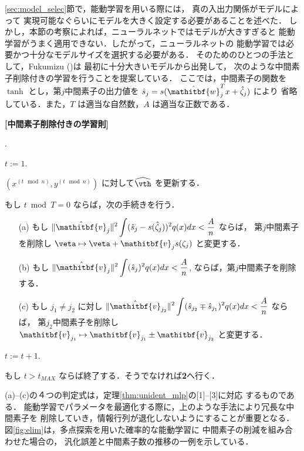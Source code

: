 \documentclass[master]{cimt}
\newcommand{\hvth}{\widehat{{\vth}}}
\newcommand{\vv}{\mathitbf{v}}
\newcommand{\vw}{\mathitbf{w}}
\begin{document}
\ref{sec:model_selec}節で，能動学習を用いる際には，
真の入出力関係がモデルによって
実現可能なぐらいにモデルを大きく設定する必要があることを述べた．
しかし，本節の考察によれば，ニューラルネットではモデルが大きすぎると
能動学習がうまく適用できない．したがって，ニューラルネットの
能動学習では必要かつ十分なモデルサイズを選択する必要がある．
そのためのひとつの手法として，Fukumizu (\cite{fuku_al_ieee})は
最初に十分大きいモデルから出発して，
次のような中間素子削除付きの学習を行うことを提案している．
ここでは，中間素子の関数を $\tanh$ 
とし，第$j$中間素子の出力値を $\hat{s}_j = 
s(\hat{\vw}_j^T x + \hat{\zeta}_j)$ により
省略している．また，$T$ は適当な自然数，$A$ は適当な正数である．

\bigskip 
\noindent
{\bf [中間素子削除付きの学習則]}
\begin{list} 
{{\bf {}}.}{\setlength{\itemsep}{2pt}\setlength{\leftmargin}{20pt}}
\item $t := 1$.  
\item  $(x^{(t\, \bmod n)}, y^{(t\, \bmod n)})$ に対して$\hvth$ 
を更新する．  
\item もし $t \bmod T = 0$ ならば，次の手続きを行う．
\begin{enumerate}
\item[(a)] もし  
${\displaystyle 
\|\hat{\vv}_{j} \|^{2} \int (\hat{s}_{j}-s(\hat{\zeta}_{j}))^{2}
q(x)dx < \frac{A}{n}}$ ならば，
第$j$中間素子を削除し 
$\veta \mapsto \veta + \vv_j s(\zeta_j)$ と変更する．
\item[(b)] もし 
${\displaystyle
\|\hat{\vv}_{j}\|^{2} \int (\hat{s}_{j})^{2}q(x)dx < \frac{A}{n}}$, 
ならば，第$j$中間素子を削除する．
\item[(c)] もし $j_{1} \neq j_{2}$ に対し 
${\displaystyle 
\| \hat{\vv}_{j_{2}}\|^{2} \int ( \hat{s}_{j_{2}} \mp
\hat{s}_{j_{1}})^{2} q(x)dx < \frac{A}{n} }$ 
ならば，
第$j_2$中間素子を削除し 
$\vv_{j_1} \mapsto \vv_{j_1}\pm \vv_{j_2}$ と変更する． 
\end{enumerate}
\item $t := t + 1$. 
\item もし $t > t_{MAX}$ ならば終了する．そうでなければ{\bf 2}へ行く． 
\end{list}
\bigskip
(a)--(c)の４つの判定式は，定理\ref{thm:unident_mlp}の[1]--[3]に対応
するものである．
能動学習でパラメータを最適化する際に，上のような手法により冗長な中間素子を
削除していき，情報行列が退化しないようにすることが重要となる．
図\ref{fig:elim}は，多点探索を用いた確率的な能動学習に
中間素子の削減を組み合わせた場合の，
汎化誤差と中間素子数の推移の一例を示している．
\end{document}
